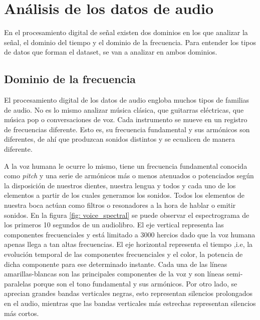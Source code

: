 \section{Análisis de los datos de audio}
En el procesamiento digital de señal existen dos dominios en los que analizar la señal, el dominio del tiempo y el dominio de la frecuencia. Para entender los tipos de datos que forman el dataset, se van a analizar en ambos dominios.

\subsection{Dominio de la frecuencia}
El procesamiento digital de los datos de audio engloba muchos tipos de familias de audio. No es lo mismo analizar música clásica, que guitarras eléctricas, que música pop o conversaciones de voz. Cada instrumento se mueve en un registro de frecuencias diferente. Esto es, su frecuencia fundamental y sus armónicos son diferentes, de ahí que produzcan sonidos distintos y se ecualicen de manera diferente.

A la voz humana le ocurre lo mismo, tiene un frecuencia fundamental conocida como \textit{pitch} y una serie de armónicos más o menos atenuados o potenciados según la disposición de nuestros dientes, nuestra lengua y todos y cada uno de los elementos a partir de los cuales generamos los sonidos. Todos los elementos de nuestra boca actúan como filtros o resonadores a la hora de hablar o emitir sonidos. En la figura \ref{fig: voice_spectral} se puede observar el espectrograma de los primeros 10 segundos de un audiolibro. El eje vertical representa las componentes frecuenciales y está limitado a 3000 hercios dado que la voz humana apenas llega a tan altas frecuencias. El eje horizontal representa el tiempo ,i.e, la evolución temporal de las componentes frecuenciales y el color, la potencia de dicha componente para ese determinado instante. Cada una de las líneas amarillas-blancas son las principales componentes de la voz y son líneas semi-paralelas porque son el tono fundamental y sus armónicos. Por otro lado, se aprecian grandes bandas verticales negras, esto representan silencios prolongados en el audio, mientras que las bandas verticales más estrechas representan silencios más cortos.

